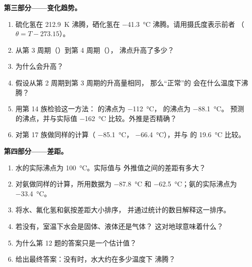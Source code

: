 \begin{problem}
\medskip
\noindent\textbf{第三部分——变化趋势。}
\begin{enumerate}[resume]
  \item 硫化氢在 \qty{212.9}{K} 沸腾，硒化氢在
        \qty{-41.3}{\celsius} 沸腾。请用摄氏度表示前者
        （$\theta = T - 273.15$）。
  \item 从第 3 周期（）到第 4 周期（），
        沸点升高了多少？
  \item 为什么会升高？
  \item 假设从第 2 周期到第 3 周期的升高量相同，
        那么“正常”的  会在什么温度下沸腾？
  \item 用第 14 族检验这一方法： 的沸点为
        \qty{-112}{\celsius}， 的沸点为 \qty{-88.1}{\celsius}。
        预测  的沸点，并与实际值
        \qty{-162}{\celsius} 比较。外推是否精确？
  \item 对第 17 族做同样的计算（ \qty{-85.1}{\celsius}，
         \qty{-66.4}{\celsius}），并与  的
        \qty{19.6}{\celsius} 比较。
\end{enumerate}

\medskip
\noindent\textbf{第四部分——差距。}
\begin{enumerate}[resume]
  \item 水的实际沸点为 \qty{100}{\celsius}。实际值与
        外推值之间的差距有多大？
  \item 对氨做同样的计算，所用数据为  \qty{-87.8}{\celsius} 和
         \qty{-62.5}{\celsius}；氨的实际沸点为
        \qty{-33.4}{\celsius}。
  \item 将水、氟化氢和氨按差距大小排序，
        并通过统计的数目解释这一排序。
  \item 若没有，室温下水会是固体、液体还是气体？
        这对地球意味着什么？
  \item 为什么第 12 题的答案只是一个估计值？
  \item 给出最终答案：没有时，水大约在多少温度下
        沸腾？
\end{enumerate}
\end{problem}
